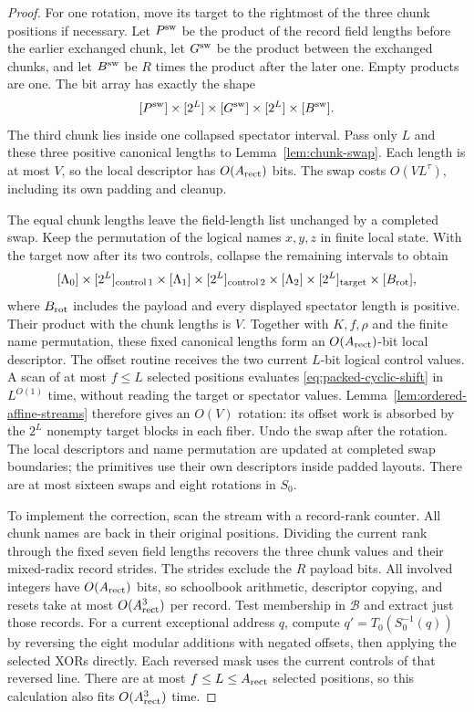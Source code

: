 \begin{proof}
For one rotation, move its target to the rightmost of the three chunk
positions if necessary. Let $P^{\rm sw}$ be the product of the record
field lengths before the earlier exchanged chunk, let $G^{\rm sw}$
be the product between the exchanged chunks, and let $B^{\rm sw}$ be
$R$ times the product after the later one. Empty products are one.
The bit array has exactly the shape
\[
 [P^{\rm sw}]\times[2^L]\times[G^{\rm sw}]
       \times[2^L]\times[B^{\rm sw}].
\]
The third chunk lies inside one collapsed spectator interval.
Pass only $L$ and these three positive canonical lengths to
Lemma~\ref{lem:chunk-swap}. Each length is at most $V$, so the local
descriptor has $O(A_{\rm rect})$ bits. The swap costs $O(VL^\tau)$, including
its own padding and cleanup.

The equal chunk lengths leave the field-length list unchanged by a
completed swap. Keep the permutation of the logical names $x,y,z$ in
finite local state. With the target now after its two controls, collapse
the remaining intervals to obtain
\[
 [\Lambda_0]\times[2^L]_{\rm control\,1}\times[\Lambda_1]
 \times[2^L]_{\rm control\,2}\times[\Lambda_2]
 \times[2^L]_{\rm target}\times[B_{\rm rot}],
\]
where $B_{\rm rot}$ includes the payload and every displayed spectator
length is positive. Their product with the chunk lengths is $V$.
Together with $K,f,\rho$ and the finite name permutation, these fixed
canonical lengths form an $O(A_{\rm rect})$-bit local descriptor. The offset
routine receives the two current $L$-bit logical control values. A scan
of at most $f\le L$ selected positions evaluates
\eqref{eq:packed-cyclic-shift} in $L^{O(1)}$ time, without reading the
target or spectator values. Lemma~\ref{lem:ordered-affine-streams}
therefore gives an $O(V)$ rotation: its offset work is absorbed by the
$2^L$ nonempty target blocks in each fiber. Undo the swap after the
rotation. The local descriptors and name permutation are updated at
completed swap boundaries; the primitives use their own descriptors
inside padded layouts.
There are at most sixteen swaps and eight rotations in $S_0$.

To implement the correction, scan the stream with a record-rank counter.
All chunk names are back in their original positions. Dividing the
current rank through the fixed seven field lengths recovers the three
chunk values and their mixed-radix record strides. The strides exclude
the $R$ payload bits. All involved integers have $O(A_{\rm rect})$ bits, so
schoolbook arithmetic, descriptor copying, and resets take at most
$O(A_{\rm rect}^3)$ per record. Test membership in $\mathcal B$ and extract just
those records. For a current exceptional address $q$, compute
$q'=T_0(S_0^{-1}(q))$ by reversing the eight modular additions with
negated offsets, then applying the selected XORs directly. Each reversed
mask uses the current controls of that reversed line. There are at most
$f\le L\le A_{\rm rect}$ selected positions, so this calculation also fits
$O(A_{\rm rect}^3)$ time.


\end{proof}
